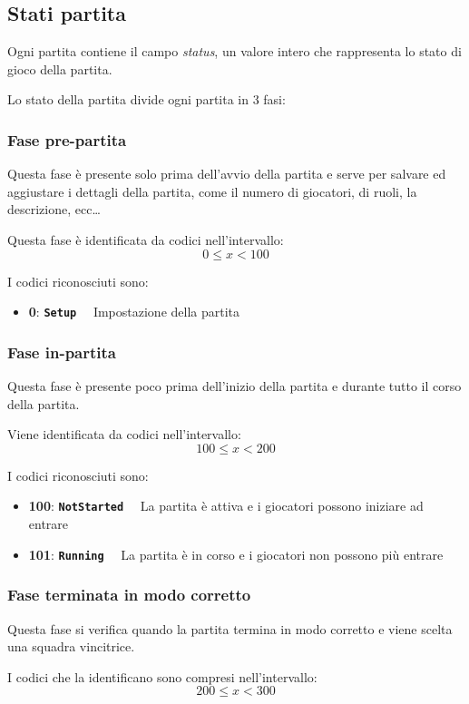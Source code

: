 \documentclass[10pt,a4paper]{article}
\newcommand{\gamestatus}[3]{
\textbf{#1}: \textbf{\texttt{#2}}$\quad$ #3
}
\begin{document}
\subsection{Stati partita}
Ogni partita contiene il campo \emph{status}, un valore intero che rappresenta lo stato di gioco della partita.

Lo stato della partita divide ogni partita in 3 fasi:

\subsubsection{Fase pre-partita}
Questa fase è presente solo prima dell'avvio della partita e serve per salvare ed aggiustare i dettagli della partita, come il numero di giocatori, di ruoli, la descrizione, ecc\dots

Questa fase è identificata da codici nell'intervallo:
\[
	0 \le x < 100
\]

I codici riconosciuti sono:
\begin{itemize}
\item \gamestatus{0}{Setup}{Impostazione della partita}
\end{itemize}

\subsubsection{Fase in-partita}
Questa fase è presente poco prima dell'inizio della partita e durante tutto il corso della partita. 

Viene identificata da codici nell'intervallo:
\[
	100 \le x < 200
\]

I codici riconosciuti sono:
\begin{itemize}
\item \gamestatus{100}{NotStarted}{La partita è attiva e i giocatori possono iniziare ad entrare}
\item \gamestatus{101}{Running}{La partita è in corso e i giocatori non possono più entrare}
\end{itemize}

\subsubsection{Fase terminata in modo corretto}
Questa fase si verifica quando la partita termina in modo corretto e viene scelta una squadra vincitrice.

I codici che la identificano sono compresi nell'intervallo:
\[
	200 \le x < 300
\]
\end{document}
